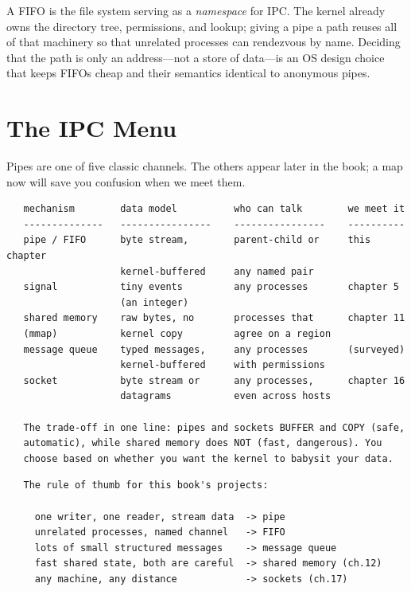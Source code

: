 \begin{osconcept}
A FIFO is the file system serving as a \emph{namespace} for IPC. The
kernel already owns the directory tree, permissions, and lookup; giving
a pipe a path reuses all of that machinery so that unrelated processes
can rendezvous by name. Deciding that the path is only an address---not
a store of data---is an OS design choice that keeps FIFOs cheap and
their semantics identical to anonymous pipes.
\end{osconcept}

\section{The IPC Menu}

Pipes are one of five classic channels. The others appear later in the
book; a map now will save you confusion when we meet them.

\begin{verbatim}
   mechanism        data model          who can talk        we meet it
   --------------   ----------------    ----------------    ----------
   pipe / FIFO      byte stream,        parent-child or     this chapter
                    kernel-buffered     any named pair
   signal           tiny events         any processes       chapter 5
                    (an integer)
   shared memory    raw bytes, no       processes that      chapter 11
   (mmap)           kernel copy         agree on a region
   message queue    typed messages,     any processes       (surveyed)
                    kernel-buffered     with permissions
   socket           byte stream or      any processes,      chapter 16
                    datagrams           even across hosts

   The trade-off in one line: pipes and sockets BUFFER and COPY (safe,
   automatic), while shared memory does NOT (fast, dangerous). You
   choose based on whether you want the kernel to babysit your data.
\end{verbatim}

\begin{verbatim}
   The rule of thumb for this book's projects:

     one writer, one reader, stream data  -> pipe
     unrelated processes, named channel   -> FIFO
     lots of small structured messages    -> message queue
     fast shared state, both are careful  -> shared memory (ch.12)
     any machine, any distance            -> sockets (ch.17)
\end{verbatim}

